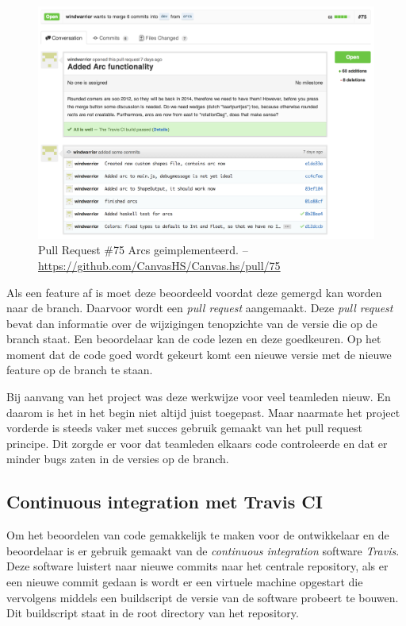 \begin{figure}
\begin{center}
\includegraphics[keepaspectratio,width=\textwidth]{./images/pullrequest.png}
\caption{Pull Request \#75 Arcs geimplementeerd. – \url{https://github.com/CanvasHS/Canvas.hs/pull/75}}
\label{fig:pullrequest}
\end{center}
\end{figure}

Als een feature af is moet deze beoordeeld voordat deze gemergd kan worden naar de  branch. Daarvoor wordt een \emph{pull request} aangemaakt. Deze \emph{pull request} bevat dan informatie over de wijzigingen tenopzichte van de versie die op de  branch staat. Een beoordelaar kan de code lezen en deze goedkeuren. Op het moment dat de code goed wordt gekeurt komt een nieuwe versie met de nieuwe feature op de  branch te staan.

Bij aanvang van het project was deze werkwijze voor veel teamleden nieuw. En daarom is het in het begin niet altijd juist toegepast. Maar naarmate het project vorderde is steeds vaker met succes gebruik gemaakt van het pull request principe. Dit zorgde er voor dat teamleden elkaars code controleerde en dat er minder bugs zaten in de versies op de  branch.

\subsection{Continuous integration met Travis CI}

Om het beoordelen van code gemakkelijk te maken voor de ontwikkelaar en de beoordelaar is er gebruik gemaakt van de \emph{continuous integration} software \emph{Travis}. Deze software luistert naar nieuwe commits naar het centrale repository, als er een nieuwe commit gedaan is wordt er een virtuele machine opgestart die vervolgens middels een buildscript de versie van de software probeert te bouwen. Dit buildscript staat in de root directory van het repository.

